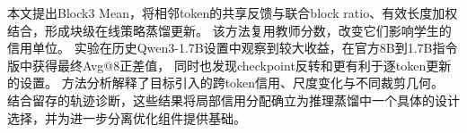 本文提出Block3 Mean，将相邻token的共享反馈与联合block ratio、有效长度加权结合，形成块级在线策略蒸馏更新。
该方法复用教师分数，改变它们影响学生的信用单位。
实验在历史Qwen3-1.7B设置中观察到较大收益，在官方8B到1.7B指令版中获得最终Avg@8正差值，
同时也发现checkpoint反转和更有利于逐token更新的设置。
方法分析解释了目标引入的跨token信用、尺度变化与不同裁剪几何。
结合留存的轨迹诊断，这些结果将局部信用分配确立为推理蒸馏中一个具体的设计选择，并为进一步分离优化组件提供基础。
